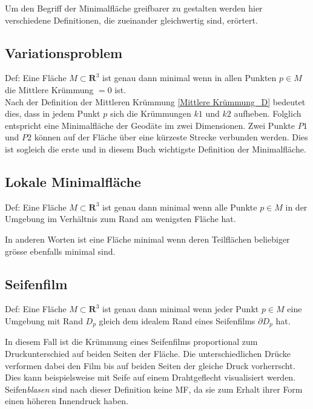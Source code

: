 \begin{refsection}
Um den Begriff der Minimalfläche greifbarer zu gestalten werden hier verschiedene Definitionen, die zueinander gleichwertig sind, erörtert.

\subsection{Variationsproblem}

Def: Eine Fläche $ \textit{M} \subset \mathbf{R}^{3} $ ist genau dann minimal wenn in allen Punkten $p \in M$ die Mittlere Krümmung $=0$ ist.\\
Nach der Definition der Mittleren Krümmung \eqref{Mittlere Krümmung_D} bedeutet dies, dass in jedem Punkt $p$ sich die Krümmungen $k1$ und $k2$ aufheben.
Folglich entspricht eine Minimalfläche der Geodäte im zwei Dimensionen. Zwei Punkte $P1$ und $P2$ können auf der Fläche über eine kürzeste Strecke verbunden werden.  Dies ist sogleich die erste und in diesem Buch wichtigste Definition der Minimalfläche.

\subsection{Lokale Minimalfläche}

Def: Eine Fläche $ \textit{M} \subset \mathbf{R}^{3} $ ist genau dann minimal wenn alle Punkte $ p \in M $ in der Umgebung  im Verhältnis zum Rand am wenigsten Fläche hat.

In anderen Worten ist eine Fläche minimal wenn deren Teilflächen beliebiger grösse ebenfalls minimal sind.  

\subsection{Seifenfilm}

Def: Eine Fläche $ \textit{M} \subset \mathbf{R}^{3} $ ist genau dann minimal wenn jeder Punkt $p \in M$ eine Umgebung mit Rand $D_p$ gleich dem idealem Rand eines Seifenfilms $\partial D_p$ hat.

In diesem Fall ist die Krümmung eines Seifenfilms proportional zum Druckunterschied auf beiden Seiten der Fläche. Die unterschiedlichen Drücke verformen dabei den Film bis auf beiden Seiten der gleiche Druck vorherrscht. Dies kann beispielsweise mit Seife auf einem Drahtgeflecht visualisiert werden. Seifen\textit{blasen} sind nach dieser Definition keine MF, da sie zum Erhalt ihrer Form einen höheren Innendruck haben.


\end{refsection}
